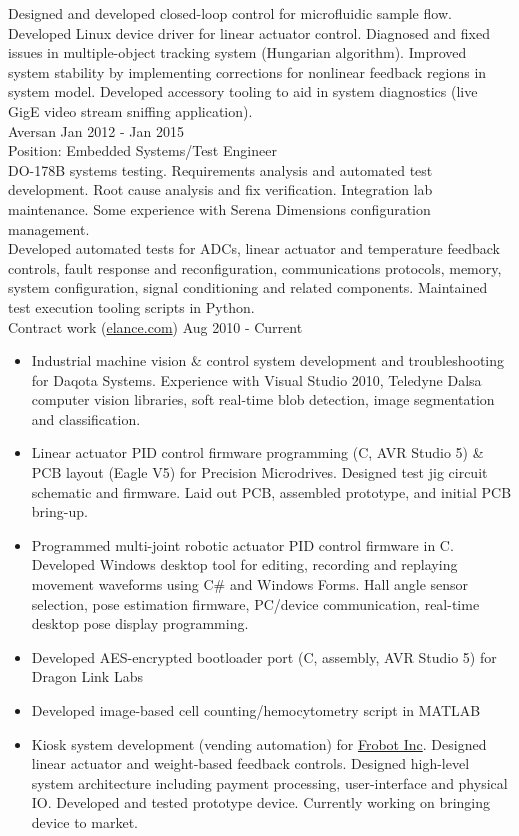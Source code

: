 \documentclass{article}
\begin{document}
Designed and developed closed-loop control for microfluidic sample flow. Developed Linux device driver for linear actuator control. Diagnosed and fixed issues in multiple-object tracking system (Hungarian algorithm). Improved system stability by implementing corrections for nonlinear feedback regions in system model. Developed accessory tooling to aid in system diagnostics (live GigE video stream sniffing application). \normalsize  \\ 

Aversan \hrulefill Jan 2012 - Jan 2015 \\
\small Position: Embedded Systems/Test Engineer \\
DO-178B systems testing. Requirements analysis and automated test development. Root cause analysis and fix verification. Integration lab maintenance. Some experience with Serena Dimensions configuration management. \\

Developed automated tests for ADCs, linear actuator and temperature feedback controls, fault response and reconfiguration, communications protocols, memory, system configuration, signal conditioning and related components. Maintained test execution tooling scripts in Python. \normalsize  \\

Contract work (\href{https://www.elance.com/s/asfarley/}{elance.com}) \hrulefill Aug 2010 - Current 
\small 
\begin{itemize}
	\item Industrial machine vision \& control system development and troubleshooting for Daqota Systems. Experience with Visual Studio 2010, Teledyne Dalsa computer vision libraries, soft real-time blob detection, image segmentation and classification. 
	\item Linear actuator PID control firmware programming (C, AVR Studio 5) \& PCB layout (Eagle V5) for Precision Microdrives. Designed test jig circuit schematic and firmware. Laid out PCB, assembled prototype, and initial PCB bring-up.
	\item Programmed multi-joint robotic actuator PID control firmware in C. Developed Windows desktop tool for editing, recording and replaying movement waveforms using C\# and Windows Forms. Hall angle sensor selection, pose estimation firmware, PC/device communication, real-time desktop pose display programming. 
	\item Developed AES-encrypted bootloader port (C, assembly, AVR Studio 5) for Dragon Link Labs
	\item Developed image-based cell counting/hemocytometry script in MATLAB
	\item Kiosk system development (vending automation) for \href{http://www.frobot.net}{Frobot Inc}. Designed linear actuator and weight-based feedback controls. Designed high-level system architecture including payment processing, user-interface and physical IO. Developed and tested prototype device. Currently working on bringing device to market.\\
\end{itemize}
\normalsize 
\end{document}
